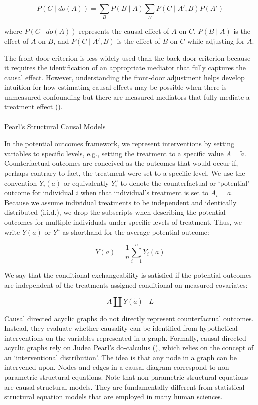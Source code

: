 \documentclass[
  single column]{article}
\makeatletter
\let\oldparagraph\paragraph
\renewcommand{\paragraph}{
    \@ifstar
      \xxxParagraphStar
      \xxxParagraphNoStar
  }
\newcommand{\xxxParagraphStar}[1]{\oldparagraph*{#1}\mbox{}}
\newcommand{\xxxParagraphNoStar}[1]{\oldparagraph{#1}\mbox{}}
\makeatother
\begin{document}
\[P(C \mid do(A)) = \sum_B P(B \mid A) \sum_{A'} P(C \mid A', B) P(A')\]

where \(P(C \mid do(A))\) represents the causal effect of \(A\) on
\(C\), \(P(B \mid A)\) is the effect of \(A\) on \(B\), and
\(P(C \mid A', B)\) is the effect of \(B\) on \(C\) while adjusting for
\(A\).

The front-door criterion is less widely used than the back-door
criterion because it requires the identification of an appropriate
mediator that fully captures the causal effect. However, understanding
the front-door adjustment helps develop intuition for how estimating
causal effects may be possible when there is unmeasured confounding but
there are measured mediators that fully mediate a treatment effect
().

\paragraph{Pearl's Structural Causal
Models}\label{pearls-structural-causal-models}

In the potential outcomes framework, we represent interventions by
setting variables to specific levels, e.g., setting the treatment to a
specific value \(A = \tilde{a}\). Counterfactual outcomes are conceived
as the outcomes that would occur if, perhaps contrary to fact, the
treatment were set to a specific level. We use the convention \(Y_i(a)\)
or equivalently \(Y_i^{a}\) to denote the counterfactual or `potential'
outcome for individual \(i\) when that individual's treatment is set to
\(A_i = a\). Because we assume individual treatments to be independent
and identically distributed (i.i.d.), we drop the subscripts when
describing the potential outcomes for multiple individuals under
specific levels of treatment. Thus, we write \(Y(a)\) or \(Y^a\) as
shorthand for the average potential outcome:

\[
Y(a) = \frac{1}{n} \sum_{i=1}^n Y_i(a)
\]

We say that the conditional exchangeability is satisfied if the
potential outcomes are independent of the treatments assigned
conditional on measured covariates:

\[
A \coprod Y(\tilde{a}) \mid L
\]

Causal directed acyclic graphs do not directly represent counterfactual
outcomes. Instead, they evaluate whether causality can be identified
from hypothetical interventions on the variables represented in a graph.
Formally, causal directed acyclic graphs rely on Judea Pearl's
do-calculus (), which relies on the
concept of an `interventional distribution'. The idea is that any node
in a graph can be intervened upon. Nodes and edges in a causal diagram
correspond to non-parametric structural equations. Note that
non-parametric structural equations are causal-structural models. They
are fundamentally different from statistical structural equation models
that are employed in many human sciences.
\end{document}

